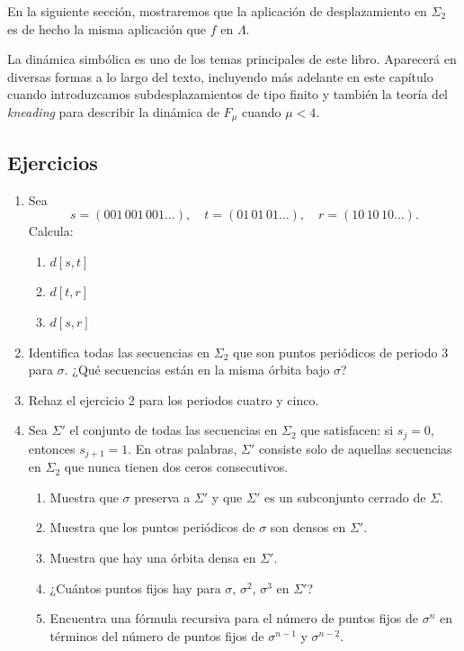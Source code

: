 \documentclass[10pt,a4paper]{book}
\begin{document}
En la siguiente sección, mostraremos que la aplicación de desplazamiento en $\Sigma_2$ es de hecho la misma aplicación que $f$ en $\Lambda$.

La dinámica simbólica es uno de los temas principales de este libro. Aparecerá en diversas formas a lo largo del texto, incluyendo más adelante en este capítulo cuando introduzcamos subdesplazamientos de tipo finito y también la teoría del \textit{kneading} para describir la dinámica de $F_\mu$ cuando $\mu < 4$.

\newpage

\subsection{Ejercicios}

\begin{enumerate}
    \item Sea
    \[
    s = (001\,001\,001\ldots), \quad t = (01\,01\,01\ldots), \quad r = (10\,10\,10\ldots).
    \]
    Calcula:
    \begin{enumerate}
        \item $d[s, t]$
        \item $d[t, r]$
        \item $d[s, r]$
    \end{enumerate}

    \item Identifica todas las secuencias en $\Sigma_2$ que son puntos periódicos de periodo 3 para $\sigma$. ¿Qué secuencias están en la misma órbita bajo $\sigma$?

    \item Rehaz el ejercicio 2 para los periodos cuatro y cinco.

    \item Sea $\Sigma'$ el conjunto de todas las secuencias en $\Sigma_2$ que satisfacen: si $s_j = 0$, entonces $s_{j+1} = 1$. En otras palabras, $\Sigma'$ consiste solo de aquellas secuencias en $\Sigma_2$ que nunca tienen dos ceros consecutivos.
    \begin{enumerate}
        \item Muestra que $\sigma$ preserva a $\Sigma'$ y que $\Sigma'$ es un subconjunto cerrado de $\Sigma$.
        \item Muestra que los puntos periódicos de $\sigma$ son densos en $\Sigma'$.
        \item Muestra que hay una órbita densa en $\Sigma'$.
        \item ¿Cuántos puntos fijos hay para $\sigma$, $\sigma^2$, $\sigma^3$ en $\Sigma'$?
        \item Encuentra una fórmula recursiva para el número de puntos fijos de $\sigma^n$ en términos del número de puntos fijos de $\sigma^{n-1}$ y $\sigma^{n-2}$.
    \end{enumerate}


\end{enumerate}
\end{document}
